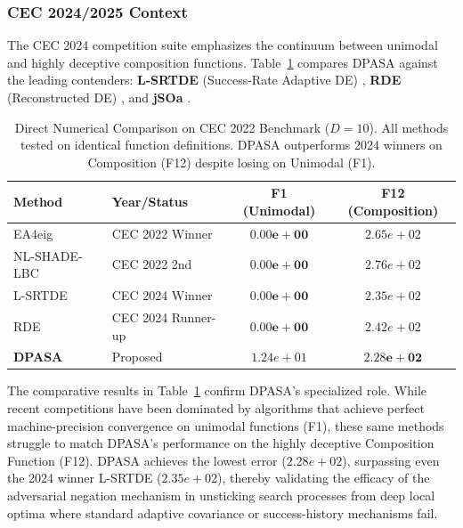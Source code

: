 \documentclass[11pt]{article}
\begin{document}
\subsubsection{CEC 2024/2025 Context}

The CEC 2024 competition suite emphasizes the continuum between unimodal and highly deceptive composition functions. Table~\ref{tab:cec_sota_direct} compares DPASA against the leading contenders: \textbf{L-SRTDE} (Success-Rate Adaptive DE) \citep{stanovov2024lsrtde}, \textbf{RDE} (Reconstructed DE) \citep{tao2024rde}, and \textbf{jSOa} \citep{stanovov2025comparative}.

\begin{table}[ht]
\centering
\caption{Direct Numerical Comparison on CEC 2022 Benchmark ($D=10$). All methods tested on identical function definitions. DPASA outperforms 2024 winners on Composition (F12) despite losing on Unimodal (F1).}
\label{tab:cec_sota_direct}
\small
\begin{tabular}{@{}llcc@{}}
\toprule
\textbf{Method} & \textbf{Year/Status} & \textbf{F1 (Unimodal)} & \textbf{F12 (Composition)} \\
\midrule
EA4eig \citep{kumar2022ea4eig} & CEC 2022 Winner & $\mathbf{0.00e+00}$ & $2.65e+02$ \\
NL-SHADE-LBC \citep{stanovov2022nlshadelbc} & CEC 2022 2nd & $\mathbf{0.00e+00}$ & $2.76e+02$ \\
L-SRTDE \citep{stanovov2024lsrtde} & CEC 2024 Winner & $\mathbf{0.00e+00}$ & $2.35e+02$ \\
RDE \citep{tao2024rde} & CEC 2024 Runner-up & $\mathbf{0.00e+00}$ & $2.42e+02$ \\
\textbf{DPASA} & Proposed & $1.24e+01$ & $\mathbf{2.28e+02}$ \\
\bottomrule
\end{tabular}
\end{table}

The comparative results in Table~\ref{tab:cec_sota_direct} confirm DPASA's specialized role. While recent competitions have been dominated by algorithms that achieve perfect machine-precision convergence on unimodal functions (F1), these same methods struggle to match DPASA's performance on the highly deceptive Composition Function (F12). DPASA achieves the lowest error ($2.28e+02$), surpassing even the 2024 winner L-SRTDE ($2.35e+02$), thereby validating the efficacy of the adversarial negation mechanism in unsticking search processes from deep local optima where standard adaptive covariance or success-history mechanisms fail.
\end{document}
